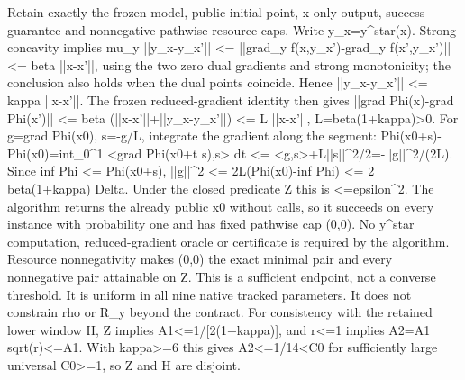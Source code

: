 \documentclass[10pt,a4paper]{article}
\begin{document}
\begingroup\raggedright\sloppy Retain exactly the frozen model,\allowbreak{} public initial point,\allowbreak{} x-only output,\allowbreak{} success guarantee and nonnegative pathwise resource caps. Write y\_\allowbreak{}x=\allowbreak{}y\textasciicircum{}star(x). Strong concavity implies mu\_\allowbreak{}y ||y\_\allowbreak{}x-y\_\allowbreak{}x'|| <=\allowbreak{} ||grad\_\allowbreak{}y f(x,\allowbreak{}y\_\allowbreak{}x')-grad\_\allowbreak{}y f(x',\allowbreak{}y\_\allowbreak{}x')|| <=\allowbreak{} beta ||x-x'||,\allowbreak{} using the two zero dual gradients and strong monotonicity;\allowbreak{} the conclusion also holds when the dual points coincide. Hence ||y\_\allowbreak{}x-y\_\allowbreak{}x'|| <=\allowbreak{} kappa ||x-x'||. The frozen reduced-gradient identity then gives ||grad Phi(x)-grad Phi(x')|| <=\allowbreak{} beta (||x-x'||+||y\_\allowbreak{}x-y\_\allowbreak{}x'||) <=\allowbreak{} L ||x-x'||,\allowbreak{} L=\allowbreak{}beta(1+kappa)>0. For g=\allowbreak{}grad Phi(x0),\allowbreak{} s=\allowbreak{}-g/\allowbreak{}L,\allowbreak{} integrate the gradient along the segment:\allowbreak{} Phi(x0+s)-Phi(x0)=\allowbreak{}int\_\allowbreak{}0\textasciicircum{}1 <grad Phi(x0+t s),\allowbreak{}s> dt <=\allowbreak{} <g,\allowbreak{}s>+L||s||\textasciicircum{}2/\allowbreak{}2=\allowbreak{}-||g||\textasciicircum{}2/\allowbreak{}(2L). Since inf Phi <=\allowbreak{} Phi(x0+s),\allowbreak{} ||g||\textasciicircum{}2 <=\allowbreak{} 2L(Phi(x0)-inf Phi) <=\allowbreak{} 2 beta(1+kappa) Delta. Under the closed predicate Z this is <=\allowbreak{}epsilon\textasciicircum{}2. The algorithm returns the already public x0 without calls,\allowbreak{} so it succeeds on every instance with probability one and has fixed pathwise cap (0,\allowbreak{}0). No y\textasciicircum{}star computation,\allowbreak{} reduced-gradient oracle or certificate is required by the algorithm. Resource nonnegativity makes (0,\allowbreak{}0) the exact minimal pair and every nonnegative pair attainable on Z. This is a sufficient endpoint,\allowbreak{} not a converse threshold. It is uniform in all nine native tracked parameters. It does not constrain rho or R\_\allowbreak{}y beyond the contract. For consistency with the retained lower window H,\allowbreak{} Z implies A1<=\allowbreak{}1/\allowbreak{}[2(1+kappa)],\allowbreak{} and r<=\allowbreak{}1 implies A2=\allowbreak{}A1 sqrt(r)<=\allowbreak{}A1. With kappa>=\allowbreak{}6 this gives A2<=\allowbreak{}1/\allowbreak{}14<C0 for sufficiently large universal C0>=\allowbreak{}1,\allowbreak{} so Z and H are disjoint.\par\endgroup
\end{document}
